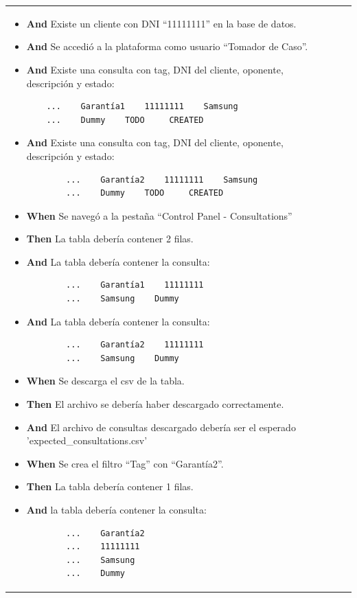 \begin{longtable}{|p{1cm}|p{2.5cm}|p{12cm}|}
\begin{itemize}
        \item \textbf{And} Existe un cliente con DNI ``11111111'' en la base de datos.
        \item \textbf{And} Se accedió a la plataforma como usuario ``Tomador de Caso''.
        \item \textbf{And} Existe una consulta con tag, DNI del cliente, oponente, descripción y estado:
        \begin{verbatim}
    ...    Garantía1    11111111    Samsung
    ...    Dummy    TODO     CREATED
        \end{verbatim}
        \item \textbf{And} Existe una consulta con tag, DNI del cliente, oponente, descripción y estado:
        \begin{verbatim}
        ...    Garantía2    11111111    Samsung
        ...    Dummy    TODO     CREATED
        \end{verbatim}
        \item \textbf{When} Se navegó a la pestaña ``Control Panel - Consultations''
    
        \item \textbf{Then} La tabla debería contener 2 filas.
        \item \textbf{And} La tabla debería contener la consulta:
        \begin{verbatim}
        ...    Garantía1    11111111
        ...    Samsung    Dummy
        \end{verbatim}
        \item \textbf{And} La tabla debería contener la consulta:
        \begin{verbatim}
        ...    Garantía2    11111111
        ...    Samsung    Dummy
        \end{verbatim}

        \item \textbf{When} Se descarga el csv de la tabla.

        \item \textbf{Then} El archivo se debería haber descargado correctamente.
        \item \textbf{And} El archivo de consultas descargado debería ser el esperado 'expected\_consultations.csv'
    
        \item \textbf{When} Se crea el filtro ``Tag'' con ``Garantía2''.
    
        \item \textbf{Then} La tabla debería contener 1 filas.
        \item \textbf{And} la tabla debería contener la consulta:
        \begin{verbatim}
        ...    Garantía2
        ...    11111111
        ...    Samsung
        ...    Dummy
        \end{verbatim}
        

\end{itemize}
\end{longtable}
